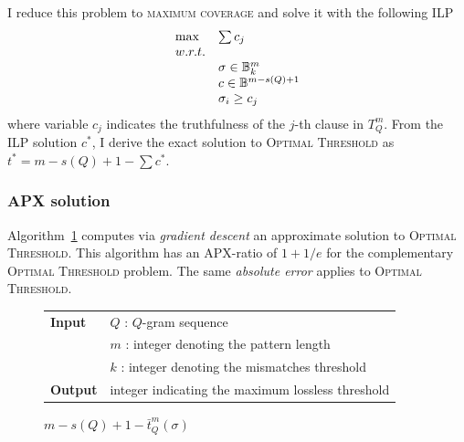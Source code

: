 I reduce this problem to \textsc{maximum coverage} \citep{Vazirani2001} and solve it with the following ILP
\begin{equation}
\begin{array}{ll}
\text{max} & \sum c_j					\\
w.r.t.							\\
& \sigma \in \mathbb {B}^m_k			\\
& c \in \mathbb {B}^{m - s(Q) + 1}		\\
& \sigma_i \geq c_j				\\
\end{array}
\end{equation}
where variable $c_j$ indicates the truthfulness of the $j$-th clause in $T_{Q}^{m}$.
From the ILP solution $c^*$, I derive the exact solution to \textsc{Optimal Threshold} as $t^* = m - s(Q) + 1 - \sum c^*$.

\subsubsection{APX solution}

Algorithm~\ref{alg:qgram-threshold-apx} computes via \emph{gradient descent} an approximate solution to \textsc{Optimal Threshold}.
This algorithm has an APX-ratio of $1 + 1/e$ \citep{Vazirani2001} for the complementary \textsc{Optimal Threshold} problem.
The same \emph{absolute error} applies to \textsc{Optimal Threshold}.

\begin{figure}[h]
\begin{center}
\begin{minipage}[t]{.8\textwidth}
\begin{algorithm}[H]
\begin{tabular}{ll}
\textbf{Input}  & $Q$ : $Q$-gram sequence\\
				& $m$ : integer denoting the pattern length\\
				& $k$ : integer denoting the mismatches threshold\\
\textbf{Output} & integer indicating the maximum lossless threshold\\
\end{tabular}
\begin{algorithmic}[1]
\EndWhile
\State \Return $m - s(Q) + 1 - \bar{t}^m_Q(\sigma)$
\end{algorithmic}
\label{alg:qgram-threshold-apx}
\end{algorithm}
\end{minipage}
\end{center}
\end{figure}

